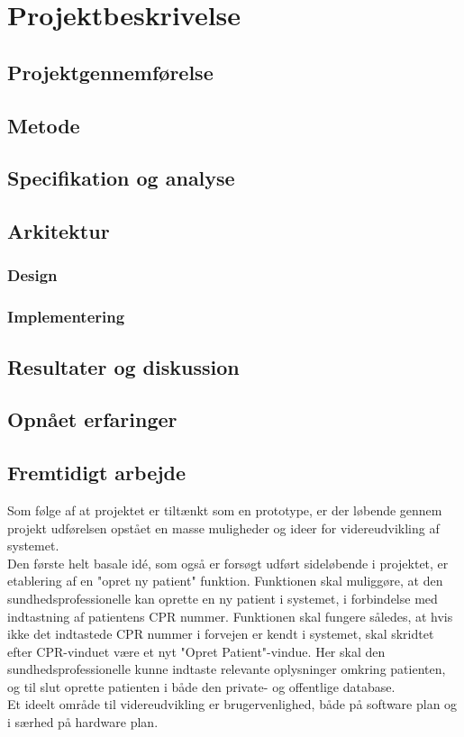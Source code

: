 \chapter{Projektbeskrivelse}

\section{Projektgennemførelse}

\section{Metode}

\section{Specifikation og analyse}

\section{Arkitektur}

\subsection{Design}

\subsection{Implementering}

\section{Resultater og diskussion}

\section{Opnået erfaringer}

\section{Fremtidigt arbejde}
Som følge af at projektet er tiltænkt som en prototype, er der løbende gennem projekt udførelsen opstået en masse muligheder og ideer for videreudvikling af systemet. \\
Den første helt basale idé, som også er forsøgt udført sideløbende i projektet, er etablering af en "opret ny patient" funktion. Funktionen skal muliggøre, at den sundhedsprofessionelle kan oprette en ny patient i systemet, i forbindelse med indtastning af patientens CPR nummer. Funktionen skal fungere således, at hvis ikke det indtastede CPR nummer i forvejen er kendt i systemet, skal skridtet efter CPR-vinduet være et nyt "Opret Patient"-vindue. Her skal den sundhedsprofessionelle kunne indtaste relevante oplysninger omkring patienten, og til slut oprette patienten i både den private- og offentlige database.\\
Et ideelt område til videreudvikling er brugervenlighed, både på software plan og i særhed på hardware plan.
